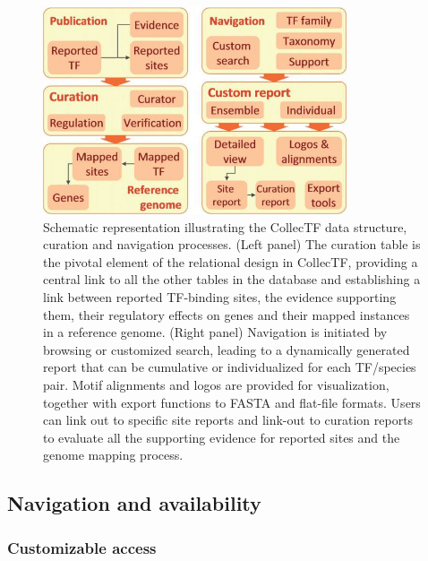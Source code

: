 \begin{figure}
  \centering
  \includegraphics[width=0.8\textwidth]{figures/chapter2/data-structure}
  \caption[Schematic representation illustrating the CollecTF data structure,
  curation and navigation processes.]{Schematic representation illustrating the
    CollecTF data structure, curation and navigation processes. (Left panel)
    The curation table is the pivotal element of the relational design in
    CollecTF, providing a central link to all the other tables in the database
    and establishing a link between reported TF-binding sites, the evidence
    supporting them, their regulatory effects on genes and their mapped
    instances in a reference genome. (Right panel) Navigation is initiated by
    browsing or customized search, leading to a dynamically generated report
    that can be cumulative or individualized for each TF/species pair. Motif
    alignments and logos are provided for visualization, together with export
    functions to FASTA and flat-file formats. Users can link out to specific
    site reports and link-out to curation reports to evaluate all the
    supporting evidence for reported sites and the genome mapping process.}
\label{fig:data-structure}
\end{figure}

\subsection{Navigation and availability}

\subsubsection{Customizable access}

